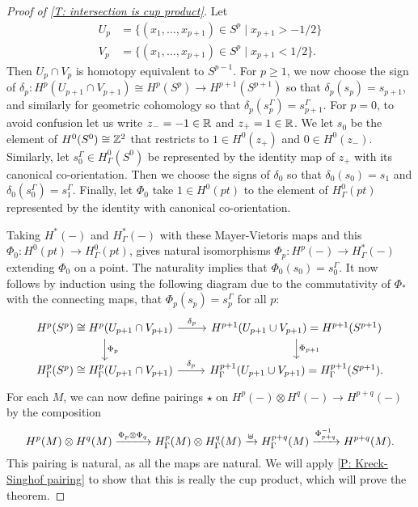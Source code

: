 \begin{proof}[Proof of \cref{T: intersection is cup product}]
	Let
	\begin{align*}
		U_p& = \{(x_1,\ldots,x_{p+1}) \in S^p \mid x_{p+1}>-1/2\}\\
		V_p& = \{(x_1,\ldots,x_{p+1}) \in S^p \mid x_{p+1}<1/2\}.
	\end{align*}
	Then $U_p \cap V_p$ is homotopy equivalent to $S^{p-1}$.
	For $p\geq 1$, we now choose the sign of $\delta_p \colon H^{p}(U_{p+1} \cap V_{p+1}) \cong H^{p}(S^p) \to H^{p+1}(S^{p+1})$ so that $\delta_p(s_p) = s_{p+1}$, and similarly for geometric cohomology so that $\delta_p(s_p^\Gamma) = s_{p+1}^\Gamma$.
	For $p = 0$, to avoid confusion let us write $z_- = -1 \in \mathbb{R}$ and $z_+ = 1 \in \mathbb{R}$.
	We let $s_0$ be the element of $H^0(S^0) \cong \mathbb{Z}^2$ that restricts to $1 \in H^0(z_+)$ and $0 \in H^0(z_-)$.
	Similarly, let $s_0^\Gamma \in H^0_\Gamma(S^0)$ be represented by the identity map of $z_+$ with its canonical co-orientation.
	Then we choose the signs of $\delta_0$ so that $\delta_0(s_0) = s_{1}$ and $\delta_0(s_0^\Gamma) = s_{1}^\Gamma$.
	Finally, let $\Phi_0$ take $1 \in H^0(pt)$ to the element of $H^0_\Gamma(pt)$ represented by the identity with canonical co-orientation.

	Taking $H^*(-)$ and $H^*_\Gamma(-)$ with these Mayer-Vietoris maps and this $\Phi_0 \colon H^0(pt) \to H^0_\Gamma(pt)$, \cite[Theorem 10]{Krec10b} gives natural isomorphisms $\Phi_p \colon H^p(-) \to H^*_\Gamma(-)$ extending $\Phi_0$ on a point.
	The naturality implies that $\Phi_0(s_0) = s_0^\Gamma$.
	It now follows by induction using the following diagram due to the commutativity of $\Phi_*$ with the connecting maps, that $\Phi_p(s_p) = s_p^\Gamma$ for all $p$:
	\[
	\begin{tikzcd}
		H^p(S^p) \cong H^p(U_{p+1} \cap V_{p+1}) \arrow{r}{\delta_p} \arrow[d, "\Phi_p"] &
		H^{p+1}(U_{p+1} \cup V_{p+1}) = H^{p+1}(S^{p+1}) \arrow[d, "\Phi_{p+1}"] \\
		H^p_\Gamma(S^p) \cong H^p_\Gamma(U_{p+1} \cap V_{p+1}) \arrow{r}{\delta_p} &
		H_\Gamma^{p+1}(U_{p+1} \cup V_{p+1}) = H^{p+1}_\Gamma(S^{p+1}).
	\end{tikzcd}
	\]
	For each $M$, we can now define pairings $\star$ on $H^p(-) \otimes H^q(-) \to H^{p+q}(-)$ by the composition
	\[
	H^p(M) \otimes H^q(M) \xrightarrow{\Phi_p \otimes \Phi_q}
	H^p_\Gamma(M) \otimes H^q_\Gamma(M) \xrightarrow{\uplus}
	H^{p+q}_\Gamma(M) \xrightarrow{\Phi_{p+q}^{-1}}
	H^{p+q}(M).
	\]
	This pairing is natural, as all the maps are natural.
	We will apply \cref{P: Kreck-Singhof pairing} to show that this is really the cup product, which will prove the theorem.


\end{proof}

